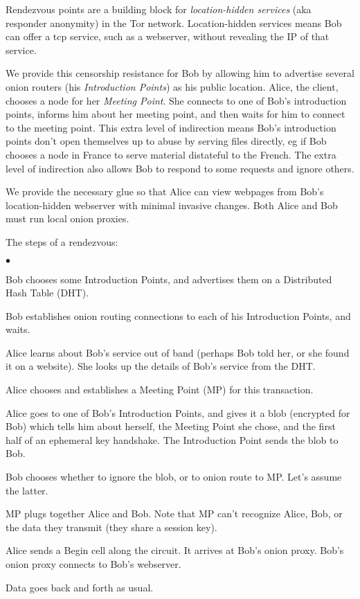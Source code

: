 \documentclass[times,10pt,twocolumn]{article}
\newenvironment{tightlist}{\begin{list}{$\bullet$}{
  \setlength{\itemsep}{0mm}
    \setlength{\parsep}{0mm}
    }}{\end{list}}
\begin{document}
\label{sec:rendezvous}

Rendezvous points are a building block for \emph{location-hidden services}
(aka responder anonymity) in the Tor network. Location-hidden
services means Bob can offer a tcp service, such as a webserver,
without revealing the IP of that service.

We provide this censorship resistance for Bob by allowing him to
advertise several onion routers (his \emph{Introduction Points}) as his
public location. Alice, the client, chooses a node for her \emph{Meeting
Point}. She connects to one of Bob's introduction points, informs him
about her meeting point, and then waits for him to connect to the meeting
point. This extra level of indirection means Bob's introduction points
don't open themselves up to abuse by serving files directly, eg if Bob
chooses a node in France to serve material distateful to the French. The
extra level of indirection also allows Bob to respond to some requests
and ignore others.

We provide the necessary glue so that Alice can view webpages from Bob's
location-hidden webserver with minimal invasive changes. Both Alice and
Bob must run local onion proxies.

The steps of a rendezvous:
\begin{tightlist}
\item Bob chooses some Introduction Points, and advertises them on a
      Distributed Hash Table (DHT).
\item Bob establishes onion routing connections to each of his
      Introduction Points, and waits.
\item Alice learns about Bob's service out of band (perhaps Bob told her,
      or she found it on a website). She looks up the details of Bob's
      service from the DHT.
\item Alice chooses and establishes a Meeting Point (MP) for this
      transaction.
\item Alice goes to one of Bob's Introduction Points, and gives it a blob
      (encrypted for Bob) which tells him about herself, the Meeting Point
      she chose, and the first half of an ephemeral key handshake. The
      Introduction Point sends the blob to Bob.
\item Bob chooses whether to ignore the blob, or to onion route to MP.
      Let's assume the latter.
\item MP plugs together Alice and Bob. Note that MP can't recognize Alice,
      Bob, or the data they transmit (they share a session key).
\item Alice sends a Begin cell along the circuit. It arrives at Bob's
      onion proxy. Bob's onion proxy connects to Bob's webserver.
\item Data goes back and forth as usual.
\end{tightlist}
\end{document}
